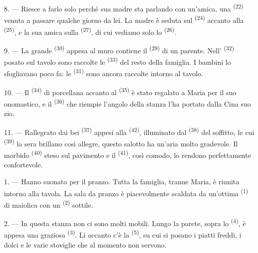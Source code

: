 8. --- Riesce a farlo solo perché sua madre sta parlando con un'amica, una
 \textsuperscript{(22)} venuta a passare qualche giorno da lei. La
madre è seduta sul  \textsuperscript{(24)} accanto alla
 \textsuperscript{(25)}, e la sua amica sulla 
\textsuperscript{(27)}, di cui vediamo solo lo 
\textsuperscript{(26)}.

9. --- La grande  \textsuperscript{(30)} appesa al muro contiene il
 \textsuperscript{(29)} di un parente. Nell'
\textsuperscript{(32)} posato sul tavolo sono raccolte le 
\textsuperscript{(33)} del resto della famiglia. I bambini lo sfogliavano poco fa: le
 \textsuperscript{(31)} sono ancora raccolte intorno al tavolo.

10. --- Il  \textsuperscript{(34)} di porcellana accanto al
 \textsuperscript{(35)} è stato regalato a Maria per il suo
onomastico, e il  \textsuperscript{(36)} che riempie l'angolo della
stanza l'ha portato dalla Cina suo zio.

11. --- Rallegrato dai bei  \textsuperscript{(37)} appesi alla
 \textsuperscript{(42)}, illuminato dal 
\textsuperscript{(38)} del soffitto, le cui 
\textsuperscript{(39)} la sera brillano così allegre, questo salotto ha un'aria molto
gradevole. Il morbido  \textsuperscript{(40)} steso sul pavimento e il
 \textsuperscript{(41)}, così comodo, lo rendono
perfettamente confortevole.

\VUsaut{3.6mm}
\VUsaut{3.0mm}

1. --- Hanno suonato per il pranzo. Tutta la famiglia, tranne Maria, è riunita intorno
alla tavola. La sala da pranzo è piacevolmente scaldata da un'ottima 
\textsuperscript{(1)} di maiolica con un  \textsuperscript{(2)} sottile.

2. --- In questa stanza non ci sono molti mobili. Lungo la parete, sopra lo
 \textsuperscript{(4)}, è appesa una graziosa 
\textsuperscript{(3)}. Lì accanto c'è la  \textsuperscript{(5)}, su
cui si posano i piatti freddi, i dolci e le varie stoviglie che al momento non
servono.


